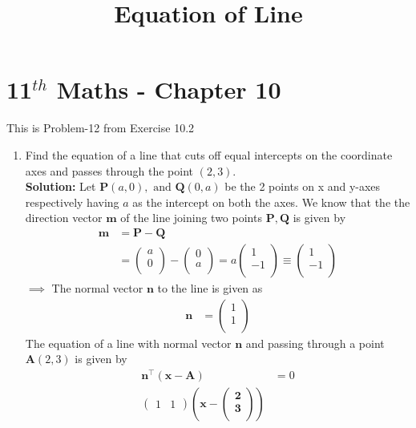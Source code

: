 \documentclass[12pt]{article}
\providecommand{\brak}[1]{\ensuremath{\left(#1\right)}}
\newcommand{\solution}{\noindent \textbf{Solution: }}
\newcommand{\myvec}[1]{\ensuremath{\begin{pmatrix}#1\end{pmatrix}}}
\let\vec\mathbf
\begin{document}
\begin{center}
\title{\textbf{Equation  of Line}}
\date{\vspace{-5ex}} %
\maketitle
\end{center}
\setcounter{page}{1}

\section{11$^{th}$ Maths - Chapter 10}
This is Problem-12 from Exercise 10.2
\begin{enumerate}
\item Find the equation of a line that cuts off equal intercepts on the coordinate axes and passes through the point $(2,3)$. \\ 
\solution 
Let $\vec{P}(a,0), \text{ and } \vec{Q}(0,a)$ be the 2 points on x and y-axes respectively having $a$ as the intercept on both the axes. We know that the the direction vector $\vec{m}$ of the line joining two points $\vec{P}, \vec{Q}$ is given by  
\begin{align}
\label{eq:1}
\vec{m} &=   \vec{P} - \vec{Q} \\
        &=   \myvec{
		a \\
		0 \\
		} - \myvec{
		   0 \\
		   a\\
		}  = a\myvec{ 
                     1 \\
		   -1 \\
        		}  \equiv \myvec{
                           1 \\
			   -1 \\
		         } 
\end{align}
$\implies$ The normal vector $\vec{n}$ to the line is given as
\begin{align}
\vec{n} &=  \myvec{
		     1 \\
		     1\\
	     } 
\end{align}
The equation of a line with normal vector $\vec{n}$ and passing through a point $\vec{A}(2,3)$ is given by
\begin{align}
	\vec{n}^\top\brak{\vec{x}-\vec{A}} &= 0 \\
	\myvec { 1 & 1 } \brak{ \vec{ x  - \myvec{ 2 \\
                                   3 \\
}}}
\end{align}
\end{enumerate}
\end{document}
